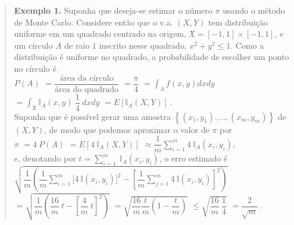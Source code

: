 \documentclass[
]{book}
\begin{document}
\begin{quote}
\textbf{Exemplo 1.} Suponha que deseja-se estimar o número \(\pi\) usando o método de Monte Carlo. Considere então que o v.a. \((X,Y)\) tem distribuição uniforme em um quadrado centrado na origem, \(\mathfrak{X}=[-1,1]\times[-1,1]\), e um círculo \(A\) de raio \(1\) inscrito nesse quadrado, \(x^2+y^2\leq 1.\) Como a distribuição é uniforme no quadrado, a probabilidade de escolher um ponto no círculo é\\
\(P(A)\) \(=\dfrac{\text{área da círculo}}{\text{área do quadrado}}\) \(=\dfrac{\pi}{4}\) \(= \displaystyle\int_A f(x,y) dxdy\) \(= \displaystyle\int_{\mathfrak{X}} \mathbb{I}_A(x,y)~\dfrac{1}{4}~dxdy\) \(=E\left[\mathbb{I}_A(X,Y)\right]~.\)\\
Suponha que é possível gerar uma amostra \(\left\{(x_1,y_1),\ldots,(x_m,y_m)\right\}\) de \((X,Y)\), de modo que podemos aproximar o valor de \(\pi\) por\\
\(\pi\) \(=4~P(A)\) \(=E\left[4~\mathbb{I}_A(X,Y)\right]\) \(\displaystyle \approx \dfrac{1}{m}\sum_{i=1}^m 4~\mathbb{I}_A(x_i,y_i)\),\\
e, denotando por \(\displaystyle t=\sum_{i=1}^m ~\mathbb{I}_A(x_i,y_i)\), o erro estimado é\\
\(\displaystyle \sqrt{\dfrac{1}{m}\left(\dfrac{1}{m}\sum_{i=1}^m\Big[4~\mathbb{I}(x_i,y_i)\Big]^2-\left[\dfrac{1}{m}\sum_{j=1}^m 4~\mathbb{I}(x_i,y_i)\right]^2\right)}\)
\(=\displaystyle \sqrt{\dfrac{1}{m}\left(\dfrac{16}{m}~t-\left[\dfrac{4}{m}~t\right]^2\right)}\)
\(= \displaystyle \sqrt{\dfrac{16}{m} \dfrac{t}{m}\left(1-\dfrac{t}{m}\right)}\)
\(\leq \displaystyle \sqrt{\dfrac{16}{m}~\dfrac{1}{4}}\)
\(= \dfrac{2}{\sqrt{m}}~.\)
\end{quote}
\end{document}
